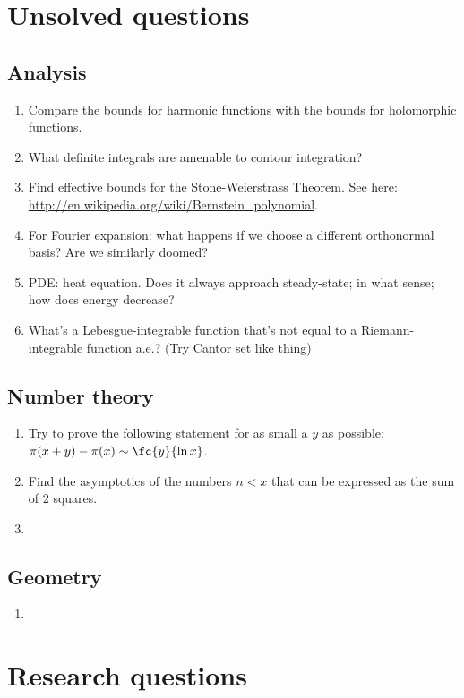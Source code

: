 \chapter{Unsolved questions}
\section{Analysis}
\begin{enumerate}
\item Compare the bounds for harmonic functions with the bounds for holomorphic functions.
\item What definite integrals are amenable to contour integration?
\item Find effective bounds for the Stone-Weierstrass Theorem. See here: \url{http://en.wikipedia.org/wiki/Bernstein_polynomial}.
\item For Fourier expansion: what happens if we choose a different orthonormal basis? Are we similarly doomed?
\item PDE: heat equation. Does it always approach steady-state; in what sense; how does energy decrease?
\item What's a Lebesgue-integrable function that's not equal to a Riemann-integrable function a.e.? (Try Cantor set like thing)
\end{enumerate}


\section{Number theory}
\begin{enumerate}
\item
Try to prove the following statement for as small a $y$ as possible: $\pi(x+y)-\pi(x)\sim \fc{y}{\ln x}$.
\item
Find the asymptotics of the numbers $n<x$ that can be expressed as the sum of 2 squares.
\item 
\end{enumerate}

\section{Geometry}
\begin{enumerate}
\item
\end{enumerate}

\chapter{Research questions}
